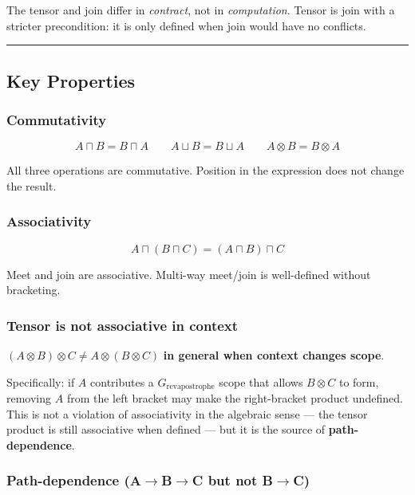 \documentclass[12pt,a4paper]{article}
\begin{document}
The tensor and join differ in \emph{contract}, not in \emph{computation}. Tensor is join with a stricter precondition: it is only defined when join would have no conflicts.

\begin{center}
\rule{0.5\textwidth}{0.4pt}
\end{center}

\subsection{Key Properties}

\subsubsection{Commutativity}

\[A \sqcap B = B \sqcap A \qquad A \sqcup B = B \sqcup A \qquad A \otimes B = B \otimes A\]

All three operations are commutative. Position in the expression does not change the result.

\subsubsection{Associativity}

\[A \sqcap (B \sqcap C) = (A \sqcap B) \sqcap C\]

Meet and join are associative. Multi-way meet/join is well-defined without bracketing.

\subsubsection{Tensor is \textbf{not} associative in context}

$(A \otimes B) \otimes C \neq A \otimes (B \otimes C)$ \textbf{in general when context changes scope}.

Specifically: if $A$ contributes a $G_{\text{revapostrophe}}$ scope that allows $B \otimes C$ to form, removing $A$ from the left bracket may make the right-bracket product undefined. This is not a violation of associativity in the algebraic sense --- the tensor product is still associative when defined --- but it is the source of \textbf{path-dependence}.

\subsubsection{Path-dependence (A$\rightarrow$B$\rightarrow$C but not B$\rightarrow$C)}
\end{document}
